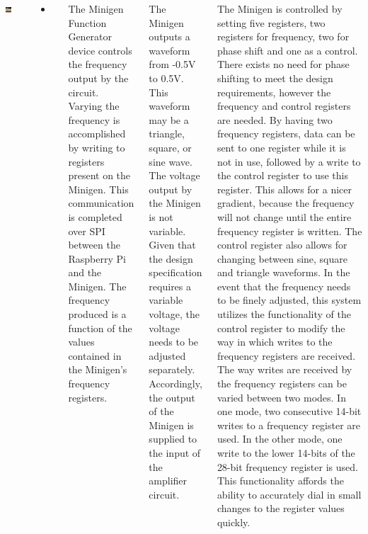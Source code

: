 \documentclass[25pt, a0paper, portrait, margin=0mm, innermargin=15mm, blockverticalspace=15mm, colspace=15mm, subcolspace=8mm]{tikzposter}
\begin{document}
\begin{columns}
{\begin{center}
\includegraphics[width=0.35\textwidth,keepaspectratio]{491_web_interface_good.png}
\end{center}

\begin{itemize}
\item 
\end{itemize}
}

{
The Minigen Function Generator device controls the frequency output by the circuit.
Varying the frequency is accomplished 
by writing to registers present on the Minigen.
This communication is completed over SPI between
the Raspberry Pi and the Minigen.
The frequency produced is a function of
the values contained in the Minigen's frequency registers.

The Minigen outputs a waveform 
from -0.5V to 0.5V. 
This waveform may be a triangle, square, or sine wave.
The voltage output by the Minigen is not variable.
Given that the design specification requires a variable voltage,
the voltage needs to be adjusted separately.
Accordingly, the output of the Minigen 
is supplied to the input of the amplifier circuit.

The Minigen is controlled by setting five registers,
two registers for frequency, 
two for phase shift and 
one as a control. 
There exists no need for phase shifting
to meet the design requirements, 
however the frequency and control registers
are needed. 
By having two frequency registers,
data can be sent to one register while it is not in use,
followed by a write to the control register to use this register.
This allows for a nicer gradient, 
because the frequency will not change until the entire frequency register is written. 
The control register also allows for changing between sine, square and triangle waveforms.
In the event that the frequency needs to be finely adjusted,
this system utilizes the functionality of the control register
to modify the way in which writes to the frequency registers are received.
The way writes are received by the frequency registers 
can be varied between two modes.
In one mode,
two consecutive 14-bit writes to a frequency register are used.
In the other mode,
one write to the lower 14-bits of the 28-bit frequency register is used.
This functionality affords the ability to accurately dial in small changes to the register values quickly.

}
\end{columns}
\end{document}
